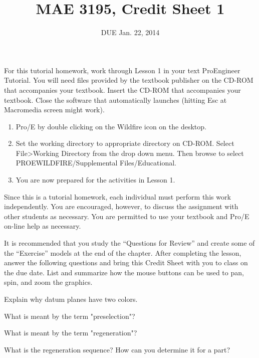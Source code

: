 \documentclass{homework}
\title{MAE 3195, Credit Sheet 1}
\author{DUE Jan. 22, 2014}
\begin{document}
For this tutorial homework, work through Lesson 1 in your text ProEngineer Tutorial. You will need files provided by the textbook publisher on the CD-ROM that accompanies your textbook. Insert the CD-ROM that accompanies your textbook. Close the software that automatically launches (hitting Esc at Macromedia screen might work).

\begin{enumerate}
\item Pro/E by double clicking on the Wildfire icon on the desktop.
\item Set the working directory to appropriate directory on CD-ROM. Select File>Working Directory from the drop down menu. Then browse to select PROEWILDFIRE/Supplemental Files/Educational.
\item You are now prepared for the activities in Lesson 1.
\end{enumerate} 

Since this is a tutorial homework, each individual must perform this work independently. You are encouraged, however, to discuss the assignment with other students as necessary. You are permitted to use your textbook and Pro/E on-line help as necessary.

It is recommended that you study the “Questions for Review” and create some of the “Exercise” models at the end of the chapter. After completing the lesson, answer the following questions and bring this Credit Sheet with you to class on the due date.
\problem{} List and summarize how the mouse buttons can be used to pan, spin, and zoom the graphics.

\problem{} Explain why datum planes have two colors.

\problem{} What is meant by the term "preselection"?
    
\problem{} What is meant by the term "regeneration"?

\problem{} What is the regeneration sequence? How can you determine it for a part?
\end{document}
